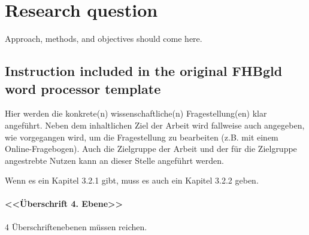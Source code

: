 \chapter{Research question}

Approach, methods, and objectives should come here.

\section{Instruction included in the original FHBgld word processor template}
Hier werden die konkrete(n) wissenschaftliche(n) Fragestellung(en) klar angeführt.
Neben dem inhaltlichen Ziel der Arbeit wird fallweise auch angegeben, wie vorgegangen wird, um die Fragestellung zu bearbeiten (z.B. mit einem Online-Fragebogen).
Auch die Zielgruppe der Arbeit und der für die Zielgruppe angestrebte Nutzen kann an dieser Stelle angeführt werden.

Wenn es ein Kapitel 3.2.1 gibt, muss es auch ein Kapitel 3.2.2 geben.

\subsubsection{<<Überschrift 4. Ebene>>}
4 Überschriftenebenen müssen reichen.


